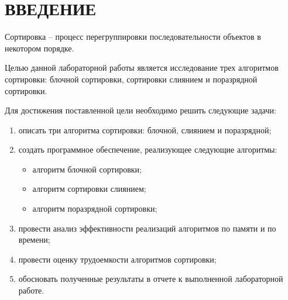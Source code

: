 \chapter*{ВВЕДЕНИЕ}

Сортировка -- процесс перегруппировки последовательности объектов в некотором порядке. 

Целью данной лабораторной работы является исследование трех алгоритмов сортировки: блочной сортировки, сортировки слиянием и поразрядной сортировки.

Для достижения поставленной цели необходимо решить следующие задачи:

\begin{enumerate}[label={\arabic*)}]
	\item описать три алгоритма сортировки: блочной, слиянием и поразрядной;
	\item создать программное обеспечение, реализующее следующие алгоритмы:
	\begin{itemize}[label=--]
		\item алгоритм блочной сортировки;
		\item алгоритм сортировки слиянием;
		\item алгоритм поразрядной сортировки;
	\end{itemize}

	\item провести анализ эффективности реализаций алгоритмов по памяти и по времени;
	\item провести оценку трудоемкости алгоритмов сортировки;
	\item обосновать полученные результаты в отчете к выполненной лабораторной работе.
\end{enumerate}
